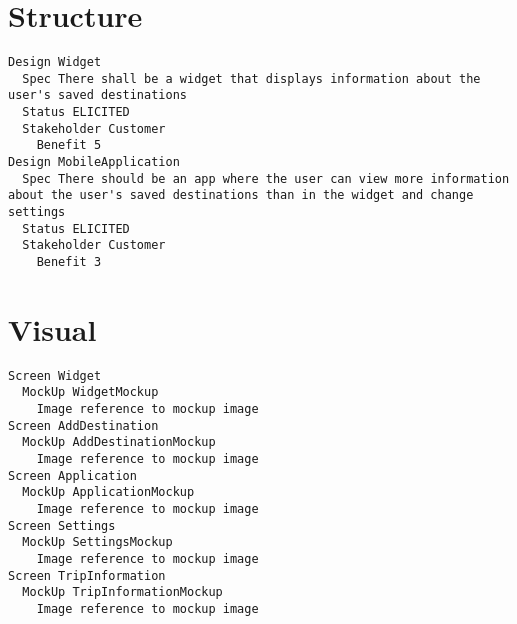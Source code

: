 \begin{lstlisting}

\end{lstlisting}


       \section{Structure}


\begin{lstlisting}
Design Widget
  Spec There shall be a widget that displays information about the user's saved destinations
  Status ELICITED
  Stakeholder Customer
    Benefit 5
Design MobileApplication
  Spec There should be an app where the user can view more information about the user's saved destinations than in the widget and change settings
  Status ELICITED
  Stakeholder Customer
    Benefit 3

\end{lstlisting}
    
        
       \section{Visual}


\begin{lstlisting}
Screen Widget
  MockUp WidgetMockup
    Image reference to mockup image
Screen AddDestination
  MockUp AddDestinationMockup
    Image reference to mockup image
Screen Application
  MockUp ApplicationMockup
    Image reference to mockup image
Screen Settings
  MockUp SettingsMockup
    Image reference to mockup image
Screen TripInformation
  MockUp TripInformationMockup
    Image reference to mockup image

\end{lstlisting}